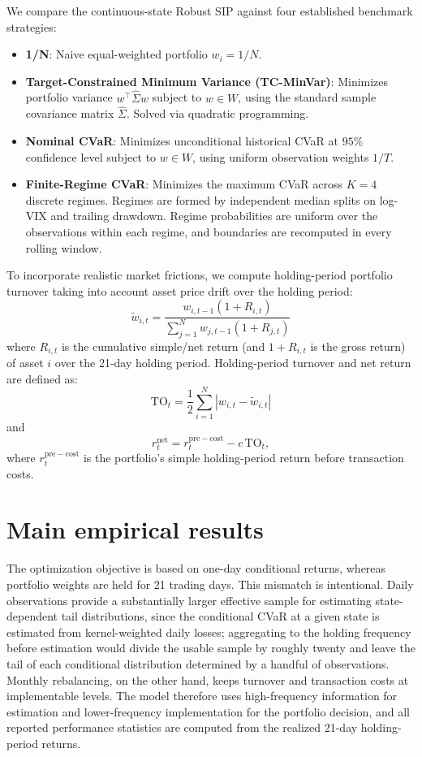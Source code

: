\documentclass[smallcondensed]{svjour3}
\begin{document}
We compare the continuous-state Robust SIP against four established benchmark strategies:
\begin{itemize}
    \item \textbf{1/N}: Naive equal-weighted portfolio $w_i = 1/N$.
    \item \textbf{Target-Constrained Minimum Variance (TC-MinVar)}: Minimizes portfolio variance $w^\top \widehat{\Sigma} w$ subject to $w \in W$, using the standard sample covariance matrix $\widehat{\Sigma}$. Solved via quadratic programming.
    \item \textbf{Nominal CVaR}: Minimizes unconditional historical CVaR at $95\%$ confidence level subject to $w \in W$, using uniform observation weights $1/T$.
    \item \textbf{Finite-Regime CVaR}: Minimizes the maximum CVaR across $K=4$ discrete regimes. Regimes are formed by independent median splits on log-VIX and trailing drawdown. Regime probabilities are uniform over the observations within each regime, and boundaries are recomputed in every rolling window.
\end{itemize}

To incorporate realistic market frictions, we compute holding-period portfolio turnover taking into account asset price drift over the holding period:
\begin{equation}
    \widetilde w_{i,t} = \frac{w_{i,t-1}(1+R_{i,t})}{\sum_{j=1}^N w_{j,t-1}(1+R_{j,t})}
\end{equation}
where $R_{i,t}$ is the cumulative simple/net return (and $1+R_{i,t}$ is the gross return) of asset $i$ over the 21-day holding period. Holding-period turnover and net return are defined as:
\begin{equation}
    \text{TO}_t = \frac{1}{2} \sum_{i=1}^N | w_{i,t} - \widetilde w_{i,t} |
\end{equation}
and
\begin{equation}
    r_t^{\mathrm{net}} = r_t^{\mathrm{pre-cost}} - c\,\mathrm{TO}_t,
\end{equation}
where $r_t^{\mathrm{pre-cost}}$ is the portfolio's simple holding-period return before transaction costs.

\section{Main empirical results}\label{sec:results}
The optimization objective is based on one-day conditional returns, whereas
portfolio weights are held for 21 trading days. This mismatch is intentional.
Daily observations provide a substantially larger effective sample for estimating
state-dependent tail distributions, since the conditional CVaR at a given state
is estimated from kernel-weighted daily losses; aggregating to the holding
frequency before estimation would divide the usable sample by roughly twenty and
leave the tail of each conditional distribution determined by a handful of
observations. Monthly rebalancing, on the other hand, keeps turnover and
transaction costs at implementable levels. The model therefore uses
high-frequency information for estimation and lower-frequency implementation for
the portfolio decision, and all reported performance statistics are computed
from the realized 21-day holding-period returns.
\end{document}
